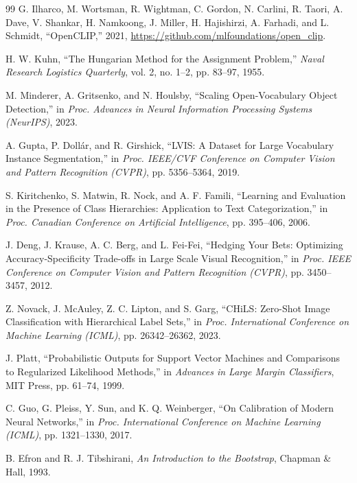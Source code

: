 \begin{thebibliography}{99}
    G. Ilharco, M. Wortsman, R. Wightman, C. Gordon, N. Carlini, R. Taori, A. Dave, V. Shankar, H. Namkoong, J. Miller, H. Hajishirzi, A. Farhadi, and L. Schmidt,
    ``OpenCLIP,''
    2021, \url{https://github.com/mlfoundations/open_clip}.

    H. W. Kuhn,
    ``The Hungarian Method for the Assignment Problem,''
    {\it Naval Research Logistics Quarterly}, vol. 2, no. 1--2, pp. 83--97, 1955.

    M. Minderer, A. Gritsenko, and N. Houlsby,
    ``Scaling Open-Vocabulary Object Detection,''
    in {\it Proc. Advances in Neural Information Processing Systems (NeurIPS)}, 2023.

    A. Gupta, P. Doll\'{a}r, and R. Girshick,
    ``LVIS: A Dataset for Large Vocabulary Instance Segmentation,''
    in {\it Proc. IEEE/CVF Conference on Computer Vision and Pattern Recognition (CVPR)}, pp. 5356--5364, 2019.

    S. Kiritchenko, S. Matwin, R. Nock, and A. F. Famili,
    ``Learning and Evaluation in the Presence of Class Hierarchies: Application to Text Categorization,''
    in {\it Proc. Canadian Conference on Artificial Intelligence}, pp. 395--406, 2006.

    J. Deng, J. Krause, A. C. Berg, and L. Fei-Fei,
    ``Hedging Your Bets: Optimizing Accuracy-Specificity Trade-offs in Large Scale Visual Recognition,''
    in {\it Proc. IEEE Conference on Computer Vision and Pattern Recognition (CVPR)}, pp. 3450--3457, 2012.

    Z. Novack, J. McAuley, Z. C. Lipton, and S. Garg,
    ``CHiLS: Zero-Shot Image Classification with Hierarchical Label Sets,''
    in {\it Proc. International Conference on Machine Learning (ICML)}, pp. 26342--26362, 2023.

    J. Platt,
    ``Probabilistic Outputs for Support Vector Machines and Comparisons to Regularized Likelihood Methods,''
    in {\it Advances in Large Margin Classifiers}, MIT Press, pp. 61--74, 1999.

    C. Guo, G. Pleiss, Y. Sun, and K. Q. Weinberger,
    ``On Calibration of Modern Neural Networks,''
    in {\it Proc. International Conference on Machine Learning (ICML)}, pp. 1321--1330, 2017.

    B. Efron and R. J. Tibshirani,
    {\it An Introduction to the Bootstrap}, Chapman \& Hall, 1993.

\end{thebibliography}
